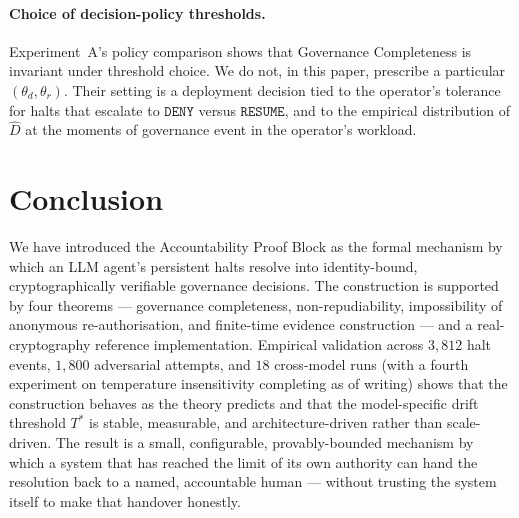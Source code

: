 \documentclass[11pt]{article}
\newcommand{\Dhat}{\widehat{D}}
\newcommand{\RESUME}{\texttt{RESUME}}
\newcommand{\DENY}{\texttt{DENY}}
\newcommand{\Tstar}{T^*}
\begin{document}
\paragraph{Choice of decision-policy thresholds.}
Experiment~A's policy comparison shows that Governance Completeness
is invariant under threshold choice. We do not, in this paper,
prescribe a particular $(\theta_d, \theta_r)$. Their setting is a
deployment decision tied to the operator's tolerance for halts that
escalate to $\DENY$ versus $\RESUME$, and to the empirical
distribution of $\Dhat$ at the moments of governance event in the
operator's workload.

\section{Conclusion}
\label{sec:conclusion}

We have introduced the Accountability Proof Block as the formal
mechanism by which an LLM agent's persistent halts resolve into
identity-bound, cryptographically verifiable governance decisions.
The construction is supported by four theorems --- governance
completeness, non-repudiability, impossibility of anonymous
re-authorisation, and finite-time evidence construction --- and a
real-cryptography reference implementation. Empirical validation
across $3{,}812$ halt events, $1{,}800$ adversarial attempts, and
$18$ cross-model runs (with a fourth experiment on temperature
insensitivity completing as of writing) shows that the construction
behaves as the theory predicts and that the model-specific drift
threshold $\Tstar$ is stable, measurable, and architecture-driven
rather than scale-driven. The result is a small, configurable,
provably-bounded mechanism by which a system that has reached the
limit of its own authority can hand the resolution back to a
named, accountable human --- without trusting the system itself
to make that handover honestly.



\end{document}
